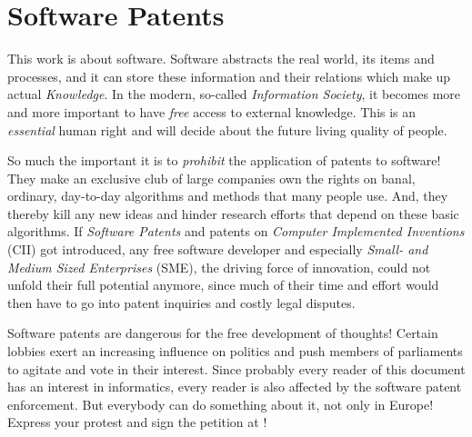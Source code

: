 %
%
%
%
%
%
%

\section*{Software Patents}
\label{software_patents_heading}

This work is about software. Software abstracts the real world, its items and
processes, and it can store these information and their relations which make up
actual \emph{Knowledge}. In the modern, so-called \emph{Information Society},
it becomes more and more important to have \emph{free} access to external
knowledge. This is an \emph{essential} human right and will decide about the
future living quality of people.

So much the important it is to \emph{prohibit} the application of patents to
software! They make an exclusive club of large companies own the rights on
banal, ordinary, day-to-day algorithms and methods that many people use. And,
they thereby kill any new ideas and hinder research efforts that depend on
these basic algorithms. If \emph{Software Patents} and patents on
\emph{Computer Implemented Inventions} (CII) got introduced, any free software
developer and especially \emph{Small- and Medium Sized Enterprises} (SME), the
driving force of innovation, could not unfold their full potential anymore,
since much of their time and effort would then have to go into patent inquiries
and costly legal disputes.

Software patents are dangerous for the free development of thoughts! Certain
lobbies exert an increasing influence on politics and push members of
parliaments to agitate and vote in their interest. Since probably every reader
of this document has an interest in informatics, every reader is also affected
by the software patent enforcement. But everybody can do something about it,
not only in Europe! Express your protest and sign the petition at \cite{ffii}!
